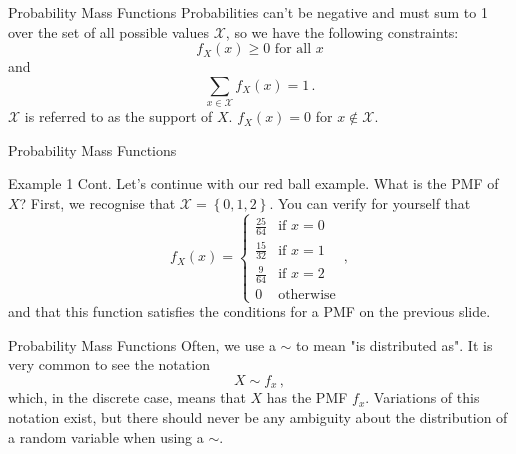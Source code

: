 \documentclass[10pt]{beamer}
\begin{document}
\begin{frame}[fragile]{Probability Mass Functions}
Probabilities can't be negative and must sum to 1 over the set of all possible values \(\mathcal{X}\), so we have the following constraints:
\begin{equation*}
    f_X\left(x\right) \geq 0 \textrm{ for all } x
\end{equation*}
and
\begin{equation*}
    \sum_{x \in \mathcal{X}} f_X\left(x\right) = 1\,.
\end{equation*}
\(\mathcal{X}\) is referred to as the support of \(X\). \(f_X\left(x\right) = 0\) for \(x \notin \mathcal{X}\).
\end{frame}

\begin{frame}[fragile]{Probability Mass Functions}
\begin{exampleblock}{Example 1 Cont.}
Let's continue with our red ball example. What is the PMF of \(X\)? First, we recognise that \(\mathcal{X} = \left\{0, 1, 2\right\}\). You can verify for yourself that
\begin{equation*}
    f_X\left(x\right) =
    \begin{cases}
        \frac{25}{64} & \textrm{if } x = 0\\
        \frac{15}{32} & \textrm{if } x = 1\\
        \frac{9}{64} & \textrm{if } x = 2\\
        0 & \textrm{otherwise}
    \end{cases}\,,
\end{equation*}
and that this function satisfies the conditions for a PMF on the previous slide.
\end{exampleblock}
\end{frame}

\begin{frame}[fragile]{Probability Mass Functions}
Often, we use a \(\sim\) to mean "is distributed as". It is very common to see the notation
\begin{equation*}
    X \sim f_x\,,
\end{equation*}
which, in the discrete case, means that \(X\) has the PMF \(f_x\). Variations of this notation exist, but there should never be any ambiguity about the distribution of a random variable when using a \(\sim\).

\end{frame}
\end{document}
